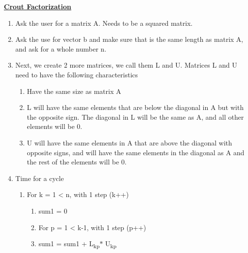\documentclass[12pt]{article}
\renewcommand{\_}{\kern-1.5pt\textunderscore\kern-1.5pt}
\begin{document}
\textbf{\uline{Crout Factorization }}\par

\begin{enumerate}
	\item Ask the user for a matrix A. Needs to be a squared matrix. \par

	\item Ask the use for vector b and make sure that is the same length as matrix A, and ask for a whole number n. \par

	\item Next, we create 2 more matrices, we call them L and U. Matrices L and U need to have the following characteristics\par

\begin{enumerate}
	\item Have the same size as matrix A \par

	\item L will have the same elements that are below the diagonal in A but with the opposite sign. The diagonal in L will be the same as A, and all other elements will be 0. \par

	\item U will have the same elements in A that are above the diagonal with opposite signs, and will have the same elements in the diagonal as A and the rest of the elements will be 0.\par


\vspace{\baselineskip}

\end{enumerate}
	\item Time for a cycle\par

\begin{enumerate}
	\item For k = 1 < n, with 1 step (k++)\par

\begin{enumerate}
	\item sum1 = 0\par

	\item For p = 1 < k-1, with 1 step (p++)\par

	\item sum1 = sum1 + L\textsubscript{kp}$\ast$  U\textsubscript{kp}\par


\end{enumerate}
\end{enumerate}
\end{enumerate}
\end{document}
